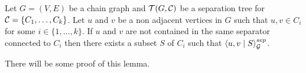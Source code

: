 \begin{lemma} \label{lemma11}
	Let $G = (V, E)$ be a chain graph and $\mathcal{T}(G, \mathcal{C})$ be a separation tree for $\mathcal{C} = \{C_1, \dots, C_k \}$. 
	Let $u$ and $v$ be a non adjacent vertices in $G$ such that $u, v \in C_i$ for some $i \in \{1, \dots, k \}$. 
	If $u$ and $v$ are not contained in the same separator connected to $C_i$ then there exists a subset $S$ of $C_i$ such that
	$\left\langle u , v \mid S \right\rangle_{\mathcal{G}}^{sep}$.
\end{lemma}

\begin{prf}
	There will be some proof of this lemma.
\end{prf}











